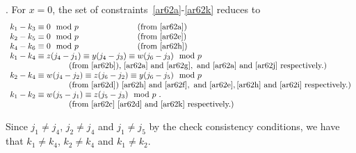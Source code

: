 . For $x=0$, the set of
constraints~\eqref{ar62a}-\eqref{ar62k} reduces to
\begin{equation}\begin{array}{llllllllllll}
k_1-k_3 \equiv 0 \mod p \hspace{1in}\text{(from \eqref{ar62a})}
\\
k_2-k_5 \equiv 0 \mod p \hspace{1in}\text{(from \eqref{ar62e})}
\\
k_4-k_6 \equiv 0 \mod p  \hspace{1in}\text{(from \eqref{ar62h})}
\\ k_1-k_4 \equiv
z(j_4-j_1) \equiv y(j_4-j_3) \equiv w(j_6-j_3) \mod p \\
\hspace{1in}\text{(from \eqref{ar62b}),}\text{ \eqref{ar62a} and
\eqref{ar62g}},\text{ and} \text{ \eqref{ar62a} and
\eqref{ar62j}}\text{ respectively.)}
\\
k_2-k_4 \equiv w(j_4-j_2) \equiv  z(j_6-j_2) \equiv y(j_6-j_5) \mod
p \\ \hspace{1in}\text{(from \eqref{ar62d})}\text{ \eqref{ar62h} and
\eqref{ar62f}},\text{ and{}{} \eqref{ar62e}},\text{\eqref{ar62h} and
\eqref{ar62i}}\text{ respectively.)}
\\
k_1-k_2 \equiv w(j_5-j_1) \equiv z(j_5-j_3) \mod p~.\\
\hspace{1in}(\text{from \eqref{ar62c}}\text{ \eqref{ar62d} and
\eqref{ar62k}} \text{ respectively.})
\end{array}\end{equation}

\noindent Since $j_1 \neq j_4$, $j_2 \neq j_4$ and $j_1 \neq j_5$ by
the check consistency conditions, we have that $k_1 \neq k_4$, $k_2
\neq k_4$ and $k_1 \neq k_2$.

